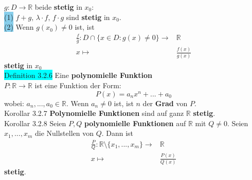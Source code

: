 \documentclass[landscape, 10pt]{article}
\newcommand{\R}{\mathbb{R}}
\begin{document}
\begin{multicols}{3}
{                     $g:D\longrightarrow\R$}
                     beide \textbf{stetig} in \textcolor{NavyBlue}{$x_0$}:\\
                     \colorbox{SkyBlue}{(1)}
                            \textcolor{NavyBlue}{
                            $f+g,\,\lambda\cdot f,\,f\cdot g$} 
                            sind \textbf{stetig} in 
                            \textcolor{NavyBlue}{$x_0$}.\\
                     \colorbox{SkyBlue}{(2)}
                            Wenn \textcolor{NavyBlue}{$g(x_0)\neq0$}
                            ist, ist 
                            \begin{align*}
                                   \frac{f}{g}:D\cap\{x\in D:g(x)\neq0\}
                                   \longrightarrow&\R\\
                                   x\longmapsto&\frac{f(x)}{g(x)}
                            \end{align*}
                            \textbf{stetig} in \textcolor{NavyBlue}{$x_0$}\\

              \colorbox{cyan}{Definition 3.2.6} 
                     Eine \textbf{polynomielle Funktion} \\
                     \textcolor{NavyBlue}{$P:\R\longrightarrow\R$} 
                     ist eine Funktion 
                     der Form: 
                     \begin{equation*}
                            P(x)=a_nx^n+...+a_0
                     \end{equation*}
                     wobei: \textcolor{NavyBlue}{$a_n,...,a_0\in\R$}. 
                     Wenn \textcolor{NavyBlue}{$a_n\neq0$} ist, ist 
                     \textcolor{NavyBlue}{$n$} 
                     der \textbf{Grad} von \textcolor{NavyBlue}{$P$}.\\
              \colorbox{BurntOrange}{Korollar 3.2.7} 
                     \textbf{Polynomielle Funktionen} 
                     sind auf ganz $\R$ \textbf{stetig}.\\
              \colorbox{BurntOrange}{Korollar 3.2.8} 
                     Seien $P,Q$ \textbf{polynomielle Funktionen} 
                     auf $\R$ mit \textcolor{NavyBlue}{$Q\neq0$}. Seien 
                     \textcolor{NavyBlue}{$x_1,...,x_m$} die Nullstellen von 
                     \textcolor{NavyBlue}{$Q$}. 
                     Dann ist 
                     \begin{align*}
                            \frac{P}{Q}:\R\setminus
                            \{x_1,...,x_m\}\longrightarrow&\R \\
                            x\longmapsto&\frac{P(x)}{Q(x)}
                     \end{align*}
                     \textbf{stetig}.\\

\end{multicols}
\end{document}
